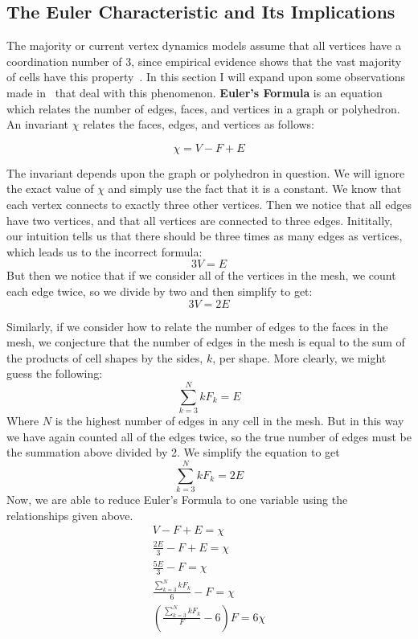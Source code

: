 \subsection{The Euler Characteristic and Its Implications}
The majority or current vertex dynamics models assume that all vertices have a coordination number of 3, since empirical evidence shows that the vast majority of cells have this property~\cite{EpithelialTopology,Overview}. In this section I will expand upon some observations made in~\cite{Soap} that deal with this phenomenon. \textbf{Euler's Formula} is an equation which relates the number of edges, faces, and vertices in a graph or polyhedron. An invariant $\chi$ relates the faces, edges, and vertices as follows:

\begin{equation}
\chi = V - F + E
\end{equation}

The invariant depends upon the graph or polyhedron in question. We will ignore the exact value of $\chi$ and simply use the fact that it is a constant. We know that each vertex connects to exactly three other vertices. Then we notice that all edges have two vertices, and that all vertices are connected to three edges. Inititally, our intuition tells us that there should be three times as many edges as vertices, which leads us to the incorrect formula:
\begin{equation}
3V = E
\end{equation}
But then we notice that if we consider all of the vertices in the mesh, we count each edge twice, so we divide by two and then simplify to get:
\begin{equation}
3V = 2E
\end{equation}

Similarly, if we consider how to relate the number of edges to the faces in the mesh, we conjecture that the number of edges in the mesh is equal to the sum of the products of cell shapes by the sides, $k$,  per shape. More clearly, we might guess the following:
\begin{equation}
\sum_{k=3}^N kF_k = E
\end{equation}
Where $N$ is the highest number of edges in any cell in the mesh. But in this way we have again counted all of the edges twice, so the true number of edges must be the summation above divided by 2. We simplify the equation to get
\begin{equation}
\sum_{k=3}^N kF_k = 2E
\end{equation}
Now, we are able to reduce Euler's Formula to one variable using the relationships given above.
\begin{gather}
V - F + E = \chi\\
\frac{2E}3 - F + E = \chi\\
\frac{5E}3 - F = \chi\\
\frac{\sum_{k=3}^N kF_k}{6} - F = \chi\\
(\frac{\sum_{k=3}^N kF_k}{F} - 6)F = 6\chi
\end{gather}

